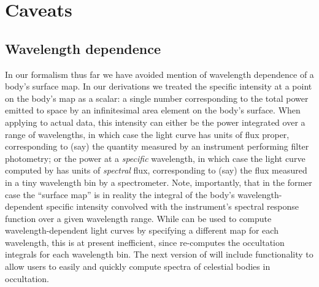 \documentclass[modern]{aastex61}
\begin{document}
\section{Caveats}
\label{sec:caveats}

\subsection{Wavelength dependence}
In our formalism thus far we have avoided mention of wavelength dependence
of a body's surface map. In our derivations we treated the specific intensity at a point
on the body's map as a scalar: a single number corresponding to the total power
emitted to space by an infinitesimal area element on the body's surface.
When applying \starry to actual data, this intensity can either
be the power integrated over a range of wavelengths, in which case the light curve
has units of flux proper,
corresponding to (say) the quantity measured by an instrument performing filter
photometry; or the power at a \emph{specific} wavelength, in which case the light curve
computed by \starry has units of \emph{spectral} flux, corresponding to (say) the
flux measured in a tiny wavelength bin by a spectrometer. Note, importantly,
that in the former case the ``surface map'' is in reality the integral of the body's
wavelength-dependent specific intensity convolved with the instrument's spectral
response function over a given wavelength range. While \starry can be used to
compute wavelength-dependent light curves by specifying a different map
for each wavelength, this is at present inefficient, since \starry re-computes
the occultation integrals for each wavelength bin. The next version of \starry
will include functionality to allow users to easily and quickly compute
spectra of celestial bodies in occultation.
\end{document}
